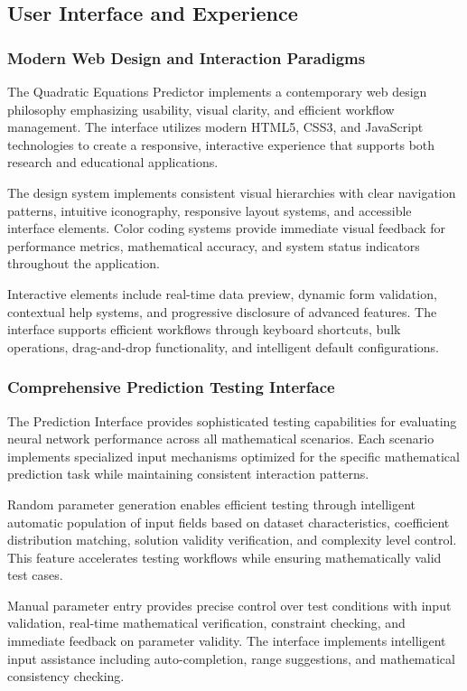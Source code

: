 \documentclass[11pt,a4paper]{report}
\begin{document}
\subsection{User Interface and Experience}

\subsubsection{Modern Web Design and Interaction Paradigms}

The Quadratic Equations Predictor implements a contemporary web design philosophy emphasizing usability, visual clarity, and efficient workflow management. The interface utilizes modern HTML5, CSS3, and JavaScript technologies to create a responsive, interactive experience that supports both research and educational applications.

The design system implements consistent visual hierarchies with clear navigation patterns, intuitive iconography, responsive layout systems, and accessible interface elements. Color coding systems provide immediate visual feedback for performance metrics, mathematical accuracy, and system status indicators throughout the application.

Interactive elements include real-time data preview, dynamic form validation, contextual help systems, and progressive disclosure of advanced features. The interface supports efficient workflows through keyboard shortcuts, bulk operations, drag-and-drop functionality, and intelligent default configurations.

\subsubsection{Comprehensive Prediction Testing Interface}

The Prediction Interface provides sophisticated testing capabilities for evaluating neural network performance across all mathematical scenarios. Each scenario implements specialized input mechanisms optimized for the specific mathematical prediction task while maintaining consistent interaction patterns.

Random parameter generation enables efficient testing through intelligent automatic population of input fields based on dataset characteristics, coefficient distribution matching, solution validity verification, and complexity level control. This feature accelerates testing workflows while ensuring mathematically valid test cases.

Manual parameter entry provides precise control over test conditions with input validation, real-time mathematical verification, constraint checking, and immediate feedback on parameter validity. The interface implements intelligent input assistance including auto-completion, range suggestions, and mathematical consistency checking.
\end{document}
